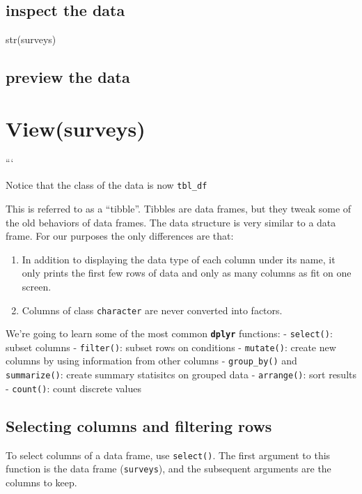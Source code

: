 \documentclass[]{article}
\providecommand{\tightlist}{%
  \setlength{\itemsep}{0pt}\setlength{\parskip}{0pt}}
\begin{document}
\subsection{inspect the data}\label{inspect-the-data}

str(surveys)

\subsection{preview the data}\label{preview-the-data}

\section{View(surveys)}\label{viewsurveys}

```

Notice that the class of the data is now \texttt{tbl\_df}

This is referred to as a ``tibble''. Tibbles are data frames, but they
tweak some of the old behaviors of data frames. The data structure is
very similar to a data frame. For our purposes the only differences are
that:

\begin{enumerate}
\def\labelenumi{\arabic{enumi}.}
\tightlist
\item
  In addition to displaying the data type of each column under its name,
  it only prints the first few rows of data and only as many columns as
  fit on one screen.
\item
  Columns of class \texttt{character} are never converted into factors.
\end{enumerate}

We're going to learn some of the most common \textbf{\texttt{dplyr}}
functions: - \texttt{select()}: subset columns - \texttt{filter()}:
subset rows on conditions - \texttt{mutate()}: create new columns by
using information from other columns - \texttt{group\_by()} and
\texttt{summarize()}: create summary statisitcs on grouped data -
\texttt{arrange()}: sort results - \texttt{count()}: count discrete
values

\subsection{Selecting columns and filtering
rows}\label{selecting-columns-and-filtering-rows}

To select columns of a data frame, use \texttt{select()}. The first
argument to this function is the data frame (\texttt{surveys}), and the
subsequent arguments are the columns to keep.
\end{document}
